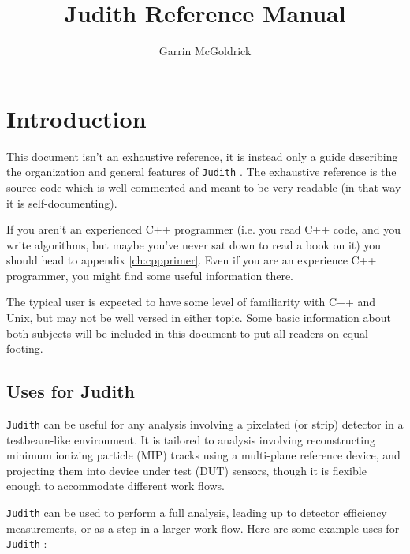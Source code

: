 \documentclass[10pt,a4paper]{book}
\author{Garrin McGoldrick}
\title{Judith Reference Manual}
\newcommand{\Judith}{\Verb`Judith` }
\begin{document}
\maketitle

\tableofcontents
\newpage


\chapter{Introduction}
\label{ch:introduction}

This document isn't an exhaustive reference, it is instead only a guide describing the organization and general features of \Judith. The exhaustive reference is the source code which is well commented and meant to be very readable (in that way it is self-documenting).

If you aren't an experienced C++ programmer (i.e. you read C++ code, and you write algorithms, but maybe you've never sat down to read a book on it) you should head to appendix \ref{ch:cppprimer}. Even if you are an experience C++ programmer, you might find some useful information there.

The typical user is expected to have some level of familiarity with C++ and Unix, but may not be well versed in either topic. Some basic information about both subjects will be included in this document to put all readers on equal footing.

\section{Uses for Judith}

\Judith can be useful for any analysis involving a pixelated (or strip) detector in a testbeam-like environment. It is tailored to analysis involving reconstructing minimum ionizing particle (MIP) tracks using a multi-plane reference device, and projecting them into device under test (DUT) sensors, though it is flexible enough to accommodate different work flows.

\Judith can be used to perform a full analysis, leading up to detector efficiency measurements, or as a step in a larger work flow. Here are some example uses for \Judith:
\end{document}
